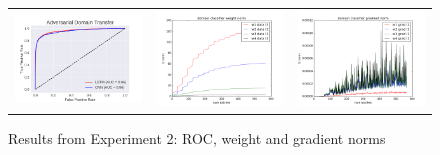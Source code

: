 \documentclass{sigkddExp}
\begin{document}
\begin{figure}[h]
\begin{tabular}{ccc}
    \includegraphics[width=0.7\columnwidth]{img/report_da_roc_adversarial_3.png}
&   \includegraphics[width=0.7\columnwidth]{img/report_da_adversarial_weight_norm.png}
&   \includegraphics[width=0.7\columnwidth]{img/report_da_adversarial_gradient_norm.png}
\end{tabular}
\label{fig:exp2c}
\caption{Results from Experiment 2: ROC, weight and gradient norms}
\end{figure}
\end{document}
